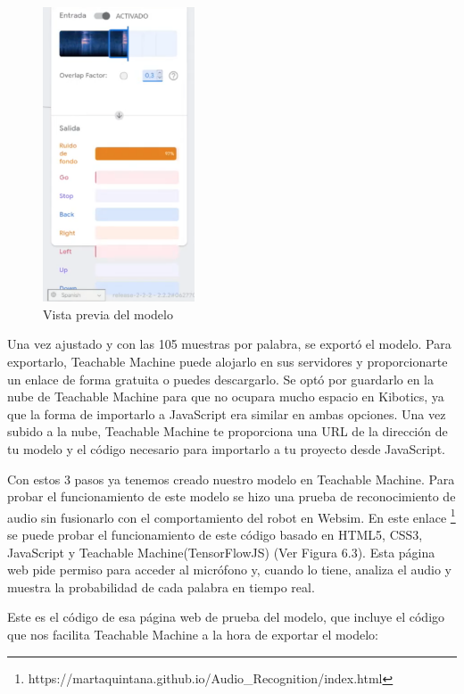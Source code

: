 \begin{itemize}
\begin{figure}[H]
 \centering
    \includegraphics[width=0.4\textwidth, height=0.6\textwidth]{chapters/images/teachablemachine2.png}
    \caption{Vista previa del modelo}
\end{figure}
 

Una vez ajustado y con las 105 muestras por palabra, se exportó el modelo. 
Para exportarlo, Teachable Machine puede alojarlo en sus servidores y proporcionarte  un enlace de forma gratuita o puedes descargarlo. Se optó por guardarlo en la nube de Teachable Machine para que no ocupara mucho espacio en Kibotics, ya que la forma de importarlo  a JavaScript era similar en ambas opciones.
Una vez subido a la nube, Teachable Machine te proporciona una URL de la dirección de tu modelo y el código necesario para importarlo a tu proyecto desde JavaScript.
\end{itemize}

Con estos 3 pasos ya tenemos creado nuestro modelo en Teachable Machine. Para probar el funcionamiento de este modelo se hizo una prueba de reconocimiento de audio sin fusionarlo con el comportamiento del robot en Websim. En este enlace \footnote{https://martaquintana.github.io/Audio\_Recognition/index.html} se puede probar el funcionamiento de este código basado en HTML5, CSS3, JavaScript y Teachable Machine(TensorFlowJS) (Ver Figura 6.3). Esta página web pide permiso para acceder al micrófono y, cuando lo tiene, analiza el audio  y muestra la probabilidad de cada palabra en tiempo real.  

Este es el código de esa página web de prueba del modelo, que incluye el código que nos facilita Teachable Machine a la hora de exportar el modelo:

